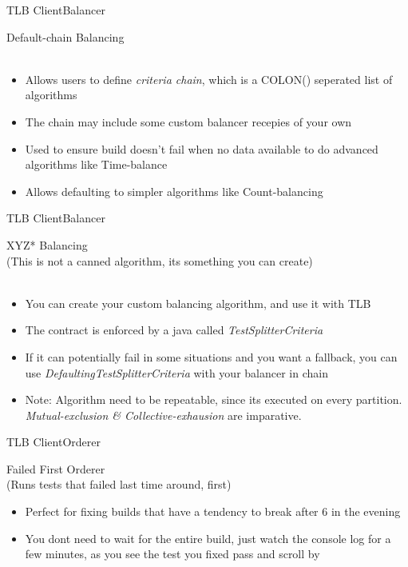 \documentclass{beamer}
\begin{document}
\begin{frame}{TLB Client}{Balancer}
  \begin{center}
    {\large Default-chain Balancing}\\
    \quad\\
    \begin{itemize}
    \item Allows users to define \emph{criteria chain}, which is a COLON(\text{:}) seperated list of algorithms
    \item The chain may include some custom balancer recepies of your own
    \item Used to ensure build doesn't fail when no data available to do advanced algorithms like Time-balance
    \item Allows defaulting to simpler algorithms like Count-balancing
    \end{itemize}
  \end{center}
\end{frame}

\begin{frame}{TLB Client}{Balancer}
  \begin{center}
    {\large *XYZ* Balancing}\\
    {\tiny (This is not a canned algorithm, its something you can create)}\\
    \quad\\
    \begin{itemize}
    \item You can create your custom balancing algorithm, and use it with TLB
    \item The contract is enforced by a java  called \emph{TestSplitterCriteria}
    \item If it can potentially fail in some situations and you want a fallback, you can use \emph{DefaultingTestSplitterCriteria} with your balancer in chain
    \item Note: Algorithm need to be repeatable, since its executed on every partition. \emph{Mutual-exclusion \& Collective-exhausion} are imparative.
    \end{itemize}
  \end{center}
\end{frame}

\begin{frame}{TLB Client}{Orderer}
  \begin{center}
    {\large Failed First Orderer}\\
    {\tiny (Runs tests that failed last time around, first)}\\
    \begin{itemize}
      \item Perfect for fixing builds that have a tendency to break after 6 in the evening
      \item You dont need to wait for the entire build, just watch the console log for a few minutes, as you see the test you fixed pass and scroll by
    \end{itemize}
  \end{center}
\end{frame}
\end{document}
